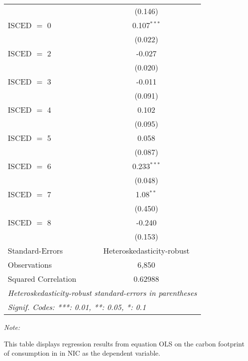 \begin{table}[htbp!]
\begin{adjustbox}{width = 1\textwidth, max height = 0.95\textheight, center}
\begin{threeparttable}[b]
\begin{tabular}{lc}
                                & (0.146)\\   
            ISCED $=$ 0         & 0.107$^{***}$\\   
                                & (0.022)\\   
            ISCED $=$ 2         & -0.027\\   
                                & (0.020)\\   
            ISCED $=$ 3         & -0.011\\   
                                & (0.091)\\   
            ISCED $=$ 4         & 0.102\\   
                                & (0.095)\\   
            ISCED $=$ 5         & 0.058\\   
                                & (0.087)\\   
            ISCED $=$ 6         & 0.233$^{***}$\\   
                                & (0.048)\\   
            ISCED $=$ 7         & 1.08$^{**}$\\   
                                & (0.450)\\   
            ISCED $=$ 8         & -0.240\\   
                                & (0.153)\\   
            \midrule 
            Standard-Errors     & Heteroskedasticity-robust \\   
            Observations        & 6,850\\  
            Squared Correlation & 0.62988\\  
            \midrule \midrule
            \multicolumn{2}{l}{\emph{Heteroskedasticity-robust standard-errors in parentheses}}\\
            \multicolumn{2}{l}{\emph{Signif. Codes: ***: 0.01, **: 0.05, *: 0.1}}\\
         \end{tabular}
         
         \begin{tablenotes}\item \medskip \textit{Note:}
            \item This table displays regression results from equation OLS on the carbon footprint of consumption in  in NIC as the dependent variable.  
         \end{tablenotes}
      \end{threeparttable}
   \end{adjustbox}
\end{table}



